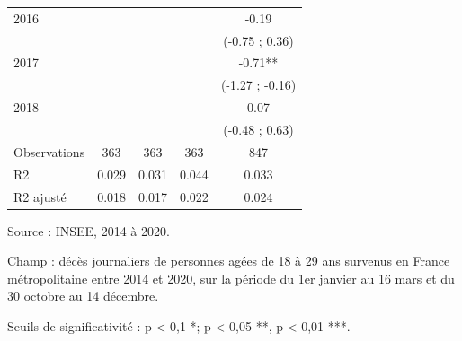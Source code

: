 \documentclass[titlepage]{article}
\begin{document}
\begin{landscape}
\begin{table}[H]
\begin{threeparttable}
\begin{tabular}[t]{lcccc}
2016 &  &  &  & -0.19\\
 &  &  &  & (-0.75 ; 0.36)\\
2017 &  &  &  & -0.71**\\
 &  &  &  & (-1.27 ; -0.16)\\
2018 &  &  &  & 0.07\\
 &  &  &  & (-0.48 ; 0.63)\\
Observations & 363 & 363 & 363 & 847\\
R2 & 0.029 & 0.031 & 0.044 & 0.033\\
R2 ajusté & 0.018 & 0.017 & 0.022 & 0.024\\
\bottomrule
\end{tabular}
\begin{tablenotes}
\item Source : INSEE, 2014 à 2020.
\item Champ : décès journaliers de personnes agées de 18 à 29 ans survenus en France métropolitaine entre 2014 et 2020, sur la période du 1er janvier au 16 mars et du 30 octobre au 14 décembre.
\item Seuils de significativité : p < 0,1 *; p < 0,05 **, p < 0,01 ***.
\end{tablenotes}
\end{threeparttable}
\end{table}\end{landscape}
\end{document}
